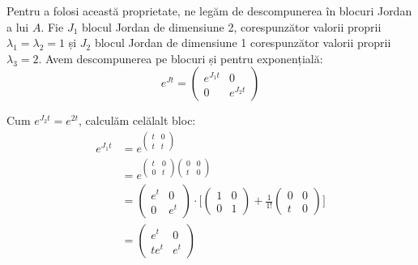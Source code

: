 Pentru a folosi această proprietate, ne legăm de descompunerea în blocuri
Jordan a lui $A$. Fie $J_1$ blocul Jordan de dimensiune 2, corespunzător
valorii proprii $\lambda_1 = \lambda_2 = 1$ și $J_2$ blocul Jordan de dimensiune 1
corespunzător valorii proprii $\lambda_3 = 2$. Avem descompunerea pe blocuri și
pentru exponențială:
\[
  e^{Jt} = \begin{pmatrix}
    e^{J_1 t} & 0 \\
    0 & e^{J_2 t}
  \end{pmatrix}
\]

Cum $e^{J_2 t} = e^{2t}$, calculăm celălalt bloc:
\begin{align*}
  e^{J_1 t} &= e^{\begin{pmatrix} t & 0 \\ t & t \end{pmatrix}} \\
            &= e^{\begin{pmatrix} t & 0 \\ 0 & t \end{pmatrix}
                                               \begin{pmatrix} 0 & 0 \\ t & 0 \end{pmatrix}} \\
            &= \begin{pmatrix} e^t & 0 \\ 0 & e^t \end{pmatrix} \cdot
                                              \Bigg[ \begin{pmatrix} 1 & 0 \\ 0 & 1 \end{pmatrix} +
                                                                                  \frac{1}{1!} \begin{pmatrix} 0 & 0 \\ t & 0 \end{pmatrix} \Bigg] \\
            &= \begin{pmatrix}
              e^t & 0 \\
              te^t & e^t 
            \end{pmatrix}
\end{align*}

